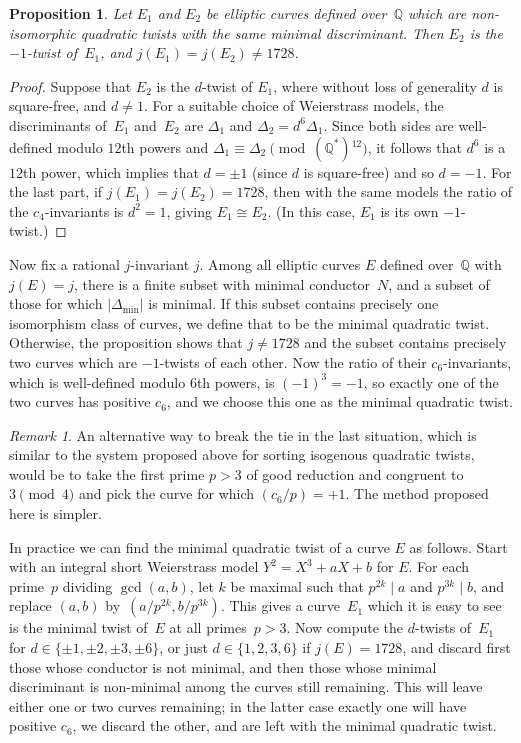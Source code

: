 \documentclass{article}
\newtheorem{prop}[thm]{Proposition}
\theoremstyle{remark}
\newtheorem{rem}{Remark}
\def\Q{{\mathbb Q}}
\begin{document}
\begin{prop} Let $E_1$ and $E_2$ be elliptic curves defined over~$\Q$
  which are non-isomorphic quadratic twists with the same minimal
  discriminant.  Then $E_2$ is the $-1$-twist of~$E_1$, and
  $j(E_1)=j(E_2)\not=1728$.
\end{prop}
\begin{proof}
Suppose that $E_2$ is the $d$-twist of $E_1$, where without loss of
generality $d$ is square-free, and $d\not=1$.  For a suitable choice
of Weierstrass models, the discriminants of~$E_1$ and~$E_2$ are
$\Delta_1$ and $\Delta_2=d^6\Delta_1$.  Since both sides are
well-defined modulo $12$th powers and
$\Delta_1\equiv\Delta_2\pmod{(\Q^*){}^{12}}$, it follows that $d^6$ is a
$12$th power, which implies that $d=\pm1$ (since $d$ is square-free)
and so $d=-1$.  For the last part, if $j(E_1)=j(E_2)=1728$, then with
the same models the ratio of the $c_4$-invariants is $d^2=1$, giving
$E_1\cong E_2$.  (In this case, $E_1$ is its own $-1$-twist.)
\end{proof}

Now fix a rational $j$-invariant $j$.  Among all elliptic curves $E$
defined over~$\Q$ with $j(E)=j$, there is a finite subset with minimal
conductor~$N$, and a subset of those for which
$\left|\Delta_{\text{min}}\right|$ is minimal.  If this subset
contains precisely one isomorphism class of curves, we define that to
be the minimal quadratic twist.  Otherwise, the proposition shows that
$j\not=1728$ and the subset contains precisely two curves which are
$-1$-twists of each other.  Now the ratio of their $c_6$-invariants,
which is well-defined modulo $6$th powers, is $(-1)^3=-1$, so exactly
one of the two curves has positive $c_6$, and we choose this one as
the minimal quadratic twist.

\begin{rem}
An alternative way to break the tie in the last situation, which is
similar to the system proposed above for sorting isogenous quadratic
twists, would be to take the first prime $p>3$ of good reduction and
congruent to~$3\pmod4$ and pick the curve for which $(c_6/p)=+1$.  The
method proposed here is simpler.
\end{rem}

In practice we can find the minimal quadratic twist of a curve $E$ as
follows.  Start with an integral short Weierstrass model
$Y^2=X^3+aX+b$ for $E$.  For each prime~$p$ dividing $\gcd(a,b)$, let
$k$ be maximal such that $p^{2k}\mid a$ and $p^{3k}\mid b$, and
replace $(a,b)$ by~$(a/p^{2k},b/p^{3k})$.  This gives a curve~$E_1$
which it is easy to see is the minimal twist of~$E$ at all
primes~$p>3$.  Now compute the $d$-twists of~$E_1$ for
$d\in\{\pm1,\pm2,\pm3,\pm6\}$, or just $d\in\{1,2,3,6\}$ if
$j(E)=1728$, and discard first those whose conductor is not minimal,
and then those whose minimal discriminant is non-minimal among the
curves still remaining. This will leave either one or two curves
remaining; in the latter case exactly one will have positive $c_6$, we
discard the other, and are left with the minimal quadratic twist.
\end{document}
